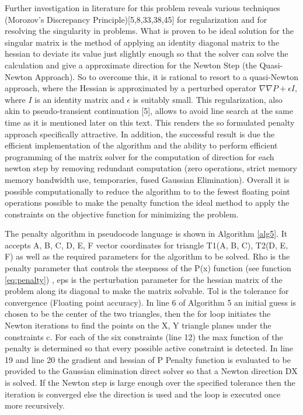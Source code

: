 \documentclass[times,12pt]{ACME2015article}
\begin{document}
Further investigation in literature for this problem reveals various techniques (Morozov's Discrepancy Principle)[5,8,33,38,45] for regularization and for resolving the singularity in problems. What is proven to be ideal solution for the singular matrix is the method of applying an identity diagonal matrix to the hessian to deviate its value just slightly enough so that the solver can solve the calculation and give a approximate direction for the Newton Step (the Quasi-Newton Approach). So to overcome this, it is rational to resort to a quasi-Newton approach, where the Hessian is approximated by a perturbed operator $\nabla\nabla P + \epsilon I$, where $I$ is an identity matrix and $\epsilon$ is suitably small. This regularization, also akin to pseudo-transient continuation [5], allows to avoid line search at the same time as it is mentioned later on this text. This renders the so formulated penalty approach specifically attractive. In addition, the successful result is due the efficient implementation of the algorithm and the ability to perform efficient programming of the matrix solver for the computation of direction for each newton step by removing redundant computation (zero operations, strict memory memory bandwidth use, temporaries, fused Gaussian Elimination). Overall it is possible computationally to reduce the algorithm to to the fewest floating point operations possible to make the penalty function the ideal method to apply the constraints on the objective function for minimizing the problem.


The penalty algorithm in pseudocode language is shown in Algorithm \ref{alg5}. It accepts A, B, C, D, E, F vector coordinates for triangle T1(A, B, C), T2(D, E, F) as well as the required parameters for the algorithm to be solved. Rho is the penalty parameter that controls the steepness of the P(x) function (see function \ref{eq:penalty}) , eps is the perturbation parameter for the hessian matrix of the problem along its diagonal to make the matrix solvable. Tol is the tolerance for convergence (Floating point accuracy). In line 6 of Algorithm 5 an initial guess is chosen to be the center of the two triangles, then the for loop initiates the Newton iterations to find the points on the X, Y triangle planes under the constraints c. For each of the six constraints (line 12) the max function of the penalty is determined so that every possible active constraint is detected. In line 19 and line 20 the gradient and hessian of P Penalty function is evaluated to be provided to the Gaussian elimination direct solver so that a Newton direction DX is solved. If the Newton step is large enough over the specified tolerance then the iteration is converged else the direction is used and the loop is executed once more recursively.
\end{document}
